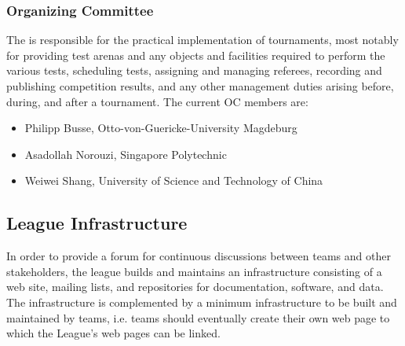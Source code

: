 \subsubsection{Organizing Committee}
The  is responsible for the practical implementation of tournaments, most notably for providing test arenas and any objects and facilities required to perform the various tests, scheduling tests, assigning and managing referees, recording and publishing competition results, and any other management duties arising before, during, and after a tournament. The current OC members are:

\begin{itemize}
	\item Philipp Busse, Otto-von-Guericke-University Magdeburg
	\item Asadollah Norouzi, Singapore Polytechnic
	\item Weiwei Shang, University of Science and Technology of China
\end{itemize}





\subsection{League Infrastructure}
In order to provide a forum for continuous discussions between teams and other stakeholders, the league builds and maintains an infrastructure consisting of a web site, mailing lists, and repositories for documentation, software, and data. The infrastructure is complemented by a minimum infrastructure to be built and maintained by teams, i.e. teams should eventually create their own web page to which the \RCAW League's web pages can be linked.

